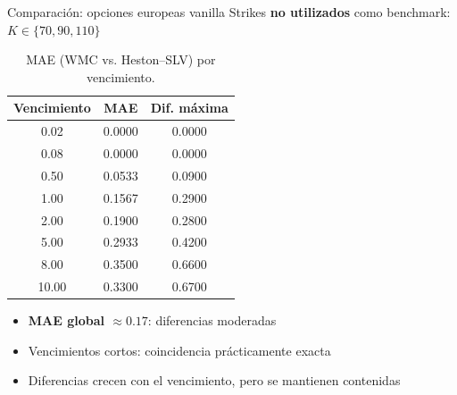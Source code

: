 \documentclass[8pt]{beamer}
\begin{document}
\begin{frame}{Comparación: opciones europeas vanilla}
    Strikes \textbf{no utilizados} como benchmark: $K \in \{70, 90, 110\}$
    
    \begin{table}
    \centering
    \small
    \begin{tabular}{|c|c|c|}
    \hline
     \textbf{Vencimiento} & \textbf{MAE} & \textbf{Dif. máxima} \\
    \hline
     0.02  & 0.0000 & 0.0000 \\
     0.08  & 0.0000 & 0.0000 \\
     0.50  & 0.0533 & 0.0900 \\
     1.00  & 0.1567 & 0.2900 \\
     2.00  & 0.1900 & 0.2800 \\
     5.00  & 0.2933 & 0.4200 \\
     8.00  & 0.3500 & 0.6600 \\
     10.00 & 0.3300 & 0.6700 \\
    \hline
    \end{tabular}
    \caption{MAE (WMC vs. Heston--SLV) por vencimiento.}
    \end{table}
    \pause
    
    \vspace{0.1cm}
    \begin{itemize}
        \item \textbf{MAE global $\approx 0.17$}: diferencias moderadas
        \item Vencimientos cortos: coincidencia prácticamente exacta
        \item Diferencias crecen con el vencimiento, pero se mantienen contenidas
    \end{itemize}
\end{frame}
\end{document}
